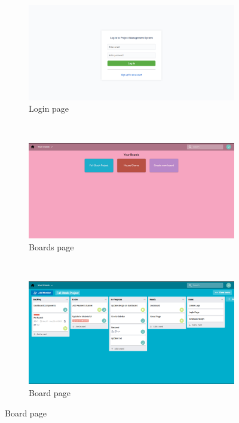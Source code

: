 \begin{figure}[h]
\begin{subfigure}{.5\textwidth}
  \centering
  \includegraphics[width=2\linewidth]{login.png}
  \caption{Login page}
  \label{fig:sfig1}
\end{subfigure}%
\\
\begin{subfigure}{.5\textwidth}
  \centering
  \includegraphics[width=2\linewidth]{boardspage.png}
  \caption{Boards page}
  \label{fig:sfig2}
\end{subfigure}
\\
\begin{subfigure}{.5\textwidth}
  \centering
  \includegraphics[width=2\linewidth]{boardpage.png}
  \caption{Board page}
  \label{fig:sfig1}
\end{subfigure}%
\end{figure}

